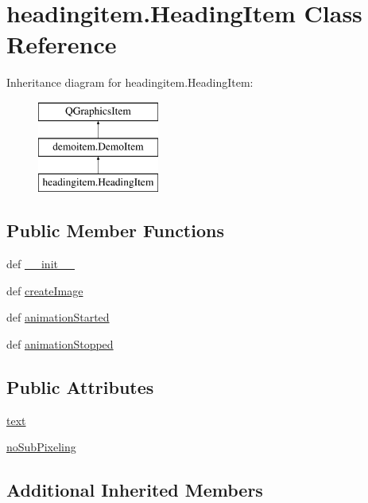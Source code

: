 \hypertarget{classheadingitem_1_1HeadingItem}{}\section{headingitem.\+Heading\+Item Class Reference}
\label{classheadingitem_1_1HeadingItem}
Inheritance diagram for headingitem.\+Heading\+Item\+:\begin{figure}[H]
\begin{center}
\leavevmode
\includegraphics[height=3.000000cm]{classheadingitem_1_1HeadingItem}
\end{center}
\end{figure}
\subsection*{Public Member Functions}
\begin{DoxyCompactItemize}
\item 
def \hyperlink{classheadingitem_1_1HeadingItem_aa1d4b92617ec70b6935a6e18d8b00457}{\+\_\+\+\_\+init\+\_\+\+\_\+}
\item 
def \hyperlink{classheadingitem_1_1HeadingItem_a4ed71cd987f16dc04a684429c8ab1930}{create\+Image}
\item 
def \hyperlink{classheadingitem_1_1HeadingItem_a9531a261eb004ea1077ade798af0f785}{animation\+Started}
\item 
def \hyperlink{classheadingitem_1_1HeadingItem_a07fc2b9a31ada596327cde7c7461faba}{animation\+Stopped}
\end{DoxyCompactItemize}
\subsection*{Public Attributes}
\begin{DoxyCompactItemize}
\item 
\hyperlink{classheadingitem_1_1HeadingItem_aede15e40fca7cb0d4a5cf30ec896c4ce}{text}
\item 
\hyperlink{classheadingitem_1_1HeadingItem_a4baa01f8d06f5444d5ac3b8d021b4317}{no\+Sub\+Pixeling}
\end{DoxyCompactItemize}
\subsection*{Additional Inherited Members}


